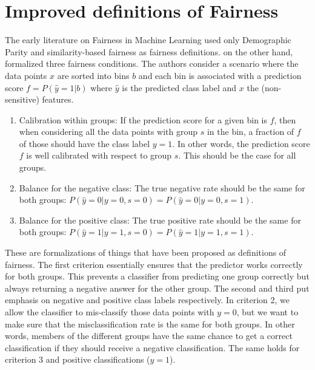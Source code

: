 \section{Improved definitions of Fairness}%
\label{improved-definitions-of-fairness}
The early literature on Fairness in Machine Learning used only Demographic Parity
and similarity-based fairness as fairness definitions.
\citet{kleinberg2016inherent} on the other hand, formalized three fairness conditions.
The authors consider a scenario where the data points \(x\) are sorted into bins \(b\)
and each bin is associated with a prediction score \(f = P(\hat{y}=1|b)\)
where \(\hat{y}\) is the predicted class label and \(x\) the (non-sensitive) features.
\begin{enumerate}
\item
  Calibration within groups:
  If the prediction score for a given bin is \(f\),
  then when considering all the data points with group \(s\) in the bin,
  a fraction of \(f\) of those should have the class label \(y=1\).
  In other words, the prediction score \(f\) is well calibrated with respect to group \(s\).
  This should be the case for all groups.
\item
  Balance for the negative class:
  The true negative rate should be the same for both groups: \(P(\hat{y}=0|y=0,s=0) = P(\hat{y}=0|y=0,s=1)\).
\item
  Balance for the positive class:
  The true positive rate should be the same for both groups: \(P(\hat{y}=1|y=1,s=0) = P(\hat{y}=1|y=1,s=1)\).
\end{enumerate}
These are formalizations of things that have been proposed as definitions of fairness.
The first criterion essentially ensures that the predictor works correctly for both groups.
This prevents a classifier from predicting one group correctly
but always returning a negative answer for the other group.
The second and third put emphasis on negative and positive class labels respectively.
In criterion 2, we allow the classifier to mis-classify those data points with \(y=0\),
but we want to make sure that the misclassification rate is the same for both groups.
In other words, members of the different groups have the same chance
to get a correct classification if they should receive a negative classification.
The same holds for criterion 3 and positive classifications (\(y=1\)).

